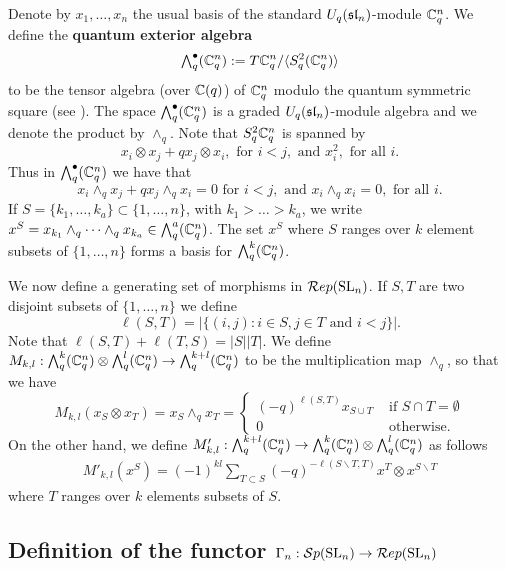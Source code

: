 \documentclass[11pt,leqno]{article}
\begin{document}
Denote by $ x_1, \dots, x_n $ the usual basis of the standard $U_q(\sl_n)$-module $\bC_q^n $. We define the {\bf quantum exterior algebra}
$$ {\textstyle \Alt^\bullet_q}(\bC_q^n) := T \bC_q^n / \langle S^2_q ( \bC_q^n) \rangle $$
to be the tensor algebra (over $\bC(q) $) of $ \bC_q^n $ modulo the quantum symmetric square (see \cite{BZ}). The space $ \Alt^\bullet_q(\bC_q^n) $ is a graded $U_q(\sl_n)$-module algebra and we denote the product by $ \wedge_q $. Note that $S^2_q \bC_q^n $ is spanned by 
$$ x_i \otimes x_j + q x_j \otimes x_i, \text{ for }  i < j , \text{ and } x_i^2, \text{ for all } i. $$ 
Thus in $ \Alt^\bullet_q(\bC_q^n) $ we have that
$$ x_i \wedge_q x_j + q x_j \wedge_q x_i = 0 \text{ for }  i < j, \text{ and } x_i \wedge_q x_i = 0, \text{ for all }  i. $$
If $ S =\{k_1, \dots, k_a\} \subset \{1, \dots, n\} $, with $ k_1 > \dots > k_a $, we write $ x^S = x_{k_1} \wedge_q \cdots \wedge_q x_{k_a} \in \Alt^a_q(\bC_q^n) $. The set $ x^S $ where $ S $ ranges over $ k $ element subsets of $ \{1, \dots, n \} $ forms a basis for $ \Alt^k_q(\bC_q^n) $.


We now define a generating set of morphisms in $\Rep(\SL_n)$. If $S, T$ are two disjoint subsets of $ \{1, \dots, n\} $ we define $$ \ell(S, T) = |\{ (i,j) : i \in S, j \in T \text{ and } i < j \}|. $$ Note that $\ell(S,T) + \ell(T,S) = |S||T| $. We define $ M_{k,l} : \Alt^k_q (\bC^n_q) \otimes \Alt^l_q(\bC^n_q) \rightarrow \Alt^{k+l}_q(\bC^n_q) $ to be the multiplication map $ \wedge_q $, so that we have
\begin{equation*}
M_{k,l}(x_S \otimes x_T) = x_S \wedge_q x_T = \begin{cases} (-q)^{\ell(S, T)} x_{S \cup T} & \text{ if } S \cap T = \emptyset \\
 0 & \text{ otherwise. }
 \end{cases} 
\end{equation*}
On the other hand, we define $M'_{k,l} :\Alt^{k+l}_q(\bC^n_q) \rightarrow \Alt^k_q (\bC^n_q) \otimes \Alt^l_q(\bC^n_q) $ as follows 
\begin{align*}
M'_{k,l}(x^S) = (-1)^{kl} \sum_{T \subset S} (-q)^{-\ell(S \smallsetminus T, T)} x^T \otimes x^{S \smallsetminus T}
\end{align*}
where $ T $ ranges over $ k $ elements subsets of $ S $.


\subsection{Definition of the functor $\Gamma_n: \Sp(\SL_n) \rightarrow \Rep(\SL_n)$} \label{sec:deffunctor}
\end{document}

